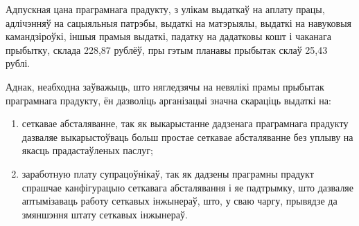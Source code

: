 Адпускная цана праграмнага прадукту, з улікам выдаткаў на аплату працы, адлічэнняў на сацыяльныя патрэбы, выдаткі на матэрыялы, выдаткі на навуковыя камандзіроўкі, іншыя прамыя выдаткі, падатку на дадатковы кошт і чаканага прыбытку, склада 228,87 рублёў, пры гэтым планавы прыбытак склаў 25,43 рублі.

Аднак, неабходна заўважыць, што нягледзячы на невялікі прамы прыбытак праграмнага прадукту, ён дазволіць арганізацыі значна скараціць выдаткі на:
\begin{enumerate}
    \item сеткавае абсталяванне, так як выкарыстанне дадзенага праграмнага прадукту дазваляе выкарыстоўваць больш простае сеткавае абсталяванне без уплыву на якасць прадастаўленых паслуг;
    \item заработную плату супрацоўнікаў, так як дадзены праграмны прадукт спрашчае канфігурацыю сеткавага абсталявання і яе падтрымку, што дазваляе аптымізаваць работу сеткавых інжынераў, што, у сваю чаргу, прывядзе да змяншэння штату сеткавых інжынераў.
\end{enumerate}
